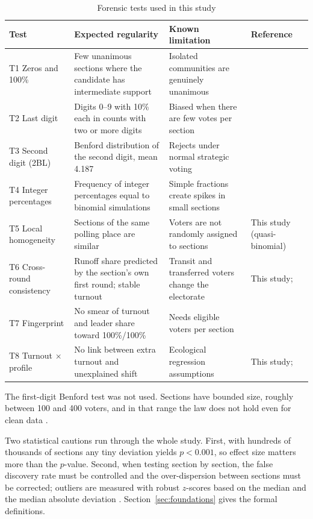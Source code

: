 \documentclass[fleqn,10pt]{SelfArx}
\begin{document}
\begin{table}[ht]
\caption{Forensic tests used in this study}
\label{tab:tests}
\centering\small
\begin{tabular}{@{}L{2.6cm} L{5.0cm} L{4.6cm} L{3.6cm}@{}}
\toprule
\textbf{Test} & \textbf{Expected regularity} & \textbf{Known limitation} & \textbf{Reference} \\
\midrule
T1 Zeros and 100\% & Few unanimous sections where the candidate has intermediate support & Isolated communities are genuinely unanimous & \cite{hicken2017} \\
T2 Last digit & Digits 0--9 with 10\% each in counts with two or more digits & Biased when there are few votes per section & \cite{beber2012,mack2019} \\
T3 Second digit (2BL) & Benford distribution of the second digit, mean 4.187 & Rejects under normal strategic voting & \cite{mebane2008,deckert2011,pericchi2011} \\
T4 Integer percentages & Frequency of integer percentages equal to binomial simulations & Simple fractions create spikes in small sections & \cite{kobak2016,rozenas2017} \\
T5 Local homogeneity & Sections of the same polling place are similar & Voters are not randomly assigned to sections & This study (quasi-binomial) \\
T6 Cross-round consistency & Runoff share predicted by the section's own first round; stable turnout & Transit and transferred voters change the electorate & This study; \cite{klimek2023} \\
T7 Fingerprint & No smear of turnout and leader share toward 100\%/100\% & Needs eligible voters per section & \cite{klimek2012,klimek2018} \\
T8 Turnout $\times$ profile & No link between extra turnout and unexplained shift & Ecological regression assumptions & This study; \cite{goodman1953} \\
\bottomrule
\end{tabular}
\end{table}

The first-digit Benford test was not used. Sections have bounded size,
roughly between 100 and 400 voters, and in that range the law does not hold
even for clean data \cite{deckert2011}.

Two statistical cautions run through the whole study. First, with hundreds
of thousands of sections any tiny deviation yields $p<0.001$, so effect
size matters more than the $p$-value. Second, when testing section by
section, the false discovery rate must be controlled \cite{benjamini1995}
and the over-dispersion between sections must be corrected; outliers are
measured with robust $z$-scores based on the median and the median absolute
deviation \cite{leys2013}. Section~\ref{sec:foundations} gives the formal
definitions.
\end{document}
